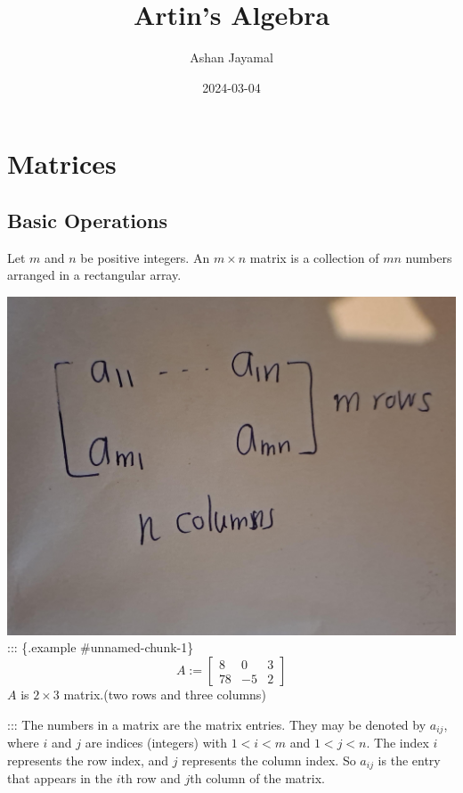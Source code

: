 \documentclass[
]{book}
\title{Artin's Algebra}
\author{Ashan Jayamal}
\date{2024-03-04}
\theoremstyle{definition}
\theoremstyle{definition}
\theoremstyle{definition}
\theoremstyle{definition}
\theoremstyle{remark}
\begin{document}
\maketitle

{
\setcounter{tocdepth}{1}
\tableofcontents
}
\hypertarget{matrices}{%
\chapter{Matrices}\label{matrices}}

\hypertarget{basic-operations}{%
\section{Basic Operations}\label{basic-operations}}

Let \(m\) and \(n\) be positive integers. An \(m \times n\) matrix is a collection of \(mn\) numbers arranged in a rectangular array.

\includegraphics{figures/ch_1/fig01.jpg}
::: \{.example \#unnamed-chunk-1\}
\[A:=\begin{bmatrix}
8 & 0 & 3\\
78 & -5 & 2
\end{bmatrix}\]
\(A\) is \(2 \times 3\) matrix.(two rows and three columns)

:::
The numbers in a matrix are the matrix entries. They may be denoted by \(a_{ij}\), where \(i\) and \(j\) are indices (integers) with \(1 < i < m\) and \(1 < j < n\). The index \(i\) represents the row index, and \(j\) represents the column index. So \(a_{ij}\) is the entry that appears in the \(i\)th row and \(j\)th column of the matrix.
\end{document}
